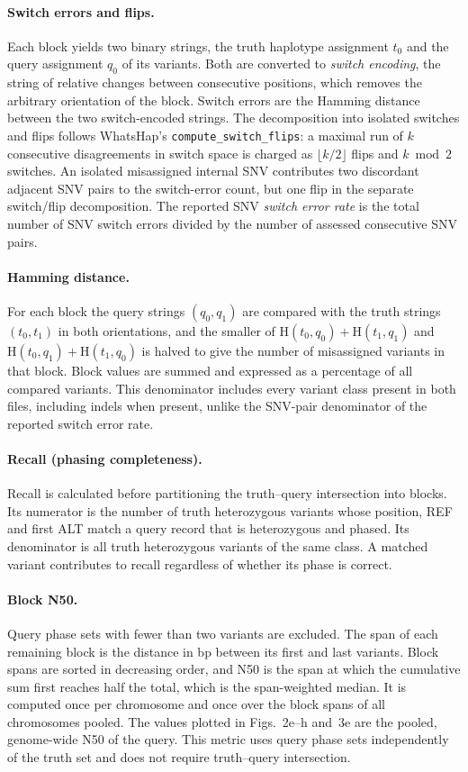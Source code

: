 \documentclass[11pt,a4paper]{article}
\newcommand{\code}[1]{\texttt{\small #1}}
\begin{document}
\paragraph{Switch errors and flips.} Each block yields two binary strings, the truth haplotype assignment $t_0$ and the query assignment $q_0$ of its variants. Both are converted to \emph{switch encoding}, the string of relative changes between consecutive positions, which removes the arbitrary orientation of the block. Switch errors are the Hamming distance between the two switch-encoded strings. The decomposition into isolated switches and flips follows WhatsHap's \code{compute\_switch\_flips}: a maximal run of $k$ consecutive disagreements in switch space is charged as $\lfloor k/2 \rfloor$ flips and $k \bmod 2$ switches. An isolated misassigned internal SNV contributes two discordant adjacent SNV pairs to the switch-error count, but one flip in the separate switch/flip decomposition. The reported SNV \emph{switch error rate} is the total number of SNV switch errors divided by the number of assessed consecutive SNV pairs.

\paragraph{Hamming distance.} For each block the query strings $(q_0,q_1)$ are compared with the truth strings $(t_0,t_1)$ in both orientations, and the smaller of $\mathrm{H}(t_0,q_0)+\mathrm{H}(t_1,q_1)$ and $\mathrm{H}(t_0,q_1)+\mathrm{H}(t_1,q_0)$ is halved to give the number of misassigned variants in that block. Block values are summed and expressed as a percentage of all compared variants. This denominator includes every variant class present in both files, including indels when present, unlike the SNV-pair denominator of the reported switch error rate.

\paragraph{Recall (phasing completeness).} Recall is calculated before partitioning the truth--query intersection into blocks. Its numerator is the number of truth heterozygous variants whose position, REF and first ALT match a query record that is heterozygous and phased. Its denominator is all truth heterozygous variants of the same class. A matched variant contributes to recall regardless of whether its phase is correct.

\paragraph{Block N50.} Query phase sets with fewer than two variants are excluded. The span of each remaining block is the distance in bp between its first and last variants. Block spans are sorted in decreasing order, and N50 is the span at which the cumulative sum first reaches half the total, which is the span-weighted median. It is computed once per chromosome and once over the block spans of all chromosomes pooled. The values plotted in Figs.~2e--h and~3e are the pooled, genome-wide N50 of the query. This metric uses query phase sets independently of the truth set and does not require truth--query intersection.
\end{document}
